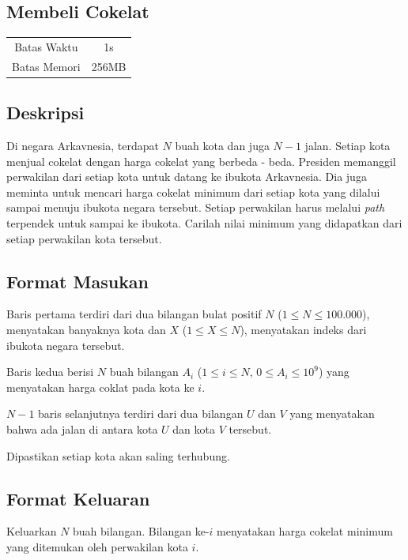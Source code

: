 \documentclass{article}
\begin{document}
\begin{center}

    
    \section*{Membeli Cokelat} %

    \begin{tabular}{ | c c | }
        \hline
        Batas Waktu  & 1s \\    %
        Batas Memori & 256MB \\  %
        \hline
    \end{tabular}
\end{center}

\subsection*{Deskripsi}
Di negara Arkavnesia, terdapat $N$ buah kota dan juga $N-1$ jalan. Setiap kota menjual cokelat dengan harga cokelat yang berbeda - beda. Presiden memanggil perwakilan dari setiap kota untuk datang ke ibukota Arkavnesia. Dia juga meminta untuk mencari harga cokelat minimum dari setiap kota yang dilalui sampai menuju ibukota negara tersebut. Setiap perwakilan harus melalui \textit{path} terpendek untuk sampai ke ibukota. Carilah nilai minimum yang didapatkan dari setiap perwakilan kota tersebut.

\subsection*{Format Masukan}
Baris pertama terdiri dari dua bilangan bulat positif $N$ ($1 \leq N \leq 100.000$), menyatakan banyaknya kota dan $X$ ($1 \leq X \leq N$), menyatakan indeks dari ibukota negara tersebut.

Baris kedua berisi $N$ buah bilangan $A_i$ ($1 \leq i \leq N$, $0 \leq A_i \leq 10^9$) yang menyatakan harga coklat pada kota ke $i$.

$N-1$ baris selanjutnya terdiri dari dua bilangan $U$ dan $V$ yang menyatakan bahwa ada jalan di antara kota $U$ dan kota $V$ tersebut.

Dipastikan setiap kota akan saling terhubung.

\subsection*{Format Keluaran}
Keluarkan $N$ buah bilangan. Bilangan ke-$i$ menyatakan harga cokelat minimum yang ditemukan oleh perwakilan kota $i$.
\end{document}
